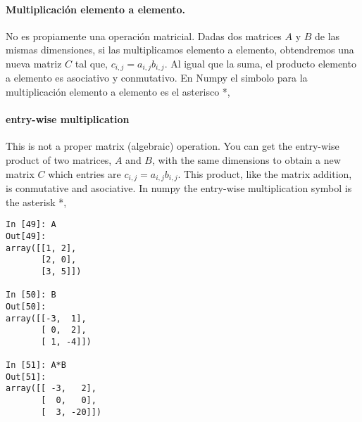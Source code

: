 \begin{paracol}{2}
\paragraph{Multiplicación elemento a elemento.} No es propiamente una operación matricial. Dadas dos matrices $A$ y $B$ de las mismas dimensiones, si las multiplicamos elemento a elemento, obtendremos una nueva matriz $C$ tal que, $c_{i,j} = a_{i,j}b_{i,j}$. Al igual que la suma, el producto elemento a elemento es asociativo y conmutativo. 
En Numpy el simbolo para la multiplicación elemento a elemento es el asterisco *,

\switchcolumn
\paragraph{entry-wise multiplication} This is not a proper matrix (algebraic) operation. You can get the entry-wise product of two matrices, $A$ and $B$, with the same dimensions to obtain a new matrix $C$ which entries are $c_{i,j} = a_{i,j}b_{i,j}$. This product, like the matrix addition, is conmutative and asociative. In numpy the entry-wise multiplication symbol is the asterisk *, 
\end{paracol}
\begin{center}
    \begin{minipage}{.5\textwidth}
        \begin{verbatim}
In [49]: A
Out[49]: 
array([[1, 2],
       [2, 0],
       [3, 5]])

In [50]: B
Out[50]: 
array([[-3,  1],
       [ 0,  2],
       [ 1, -4]])

In [51]: A*B
Out[51]: 
array([[ -3,   2],
       [  0,   0],
       [  3, -20]])
\end{verbatim}
\end{minipage}
\end{center}
